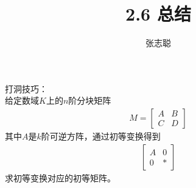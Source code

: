 \documentclass{article}
\begin{document}
\title{2.6 总结}
\author{张志聪}
\maketitle

\begin{zremark}
  打洞技巧：\\
  给定数域$K$上的$n$阶分块矩阵
  \begin{align*}
    M = \begin{bmatrix}
          A & B \\
          C & D
        \end{bmatrix}
  \end{align*}
  其中$A$是$k$阶可逆方阵，通过初等变换得到
  \begin{align*}
    \begin{bmatrix}
      A & 0 \\
      0 & *
    \end{bmatrix}
  \end{align*}
  求初等变换对应的初等矩阵。
\end{zremark}
\end{document}
